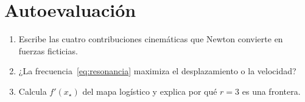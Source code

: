 \section{Autoevaluación}
\begin{enumerate}[leftmargin=1.4em]
\item Escribe las cuatro contribuciones cinemáticas que Newton convierte en fuerzas ficticias.
\item ¿La frecuencia~\eqref{eq:resonancia} maximiza el desplazamiento o la velocidad?
\item Calcula \(f'(x_\star)\) del mapa logístico y explica por qué \(r=3\) es una frontera.
\end{enumerate}
